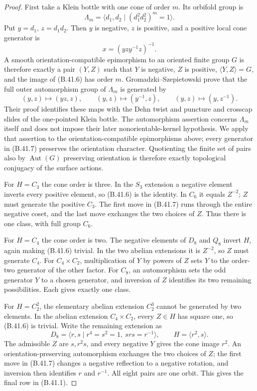 \begin{proof}
First take a Klein bottle with one cone of order $m$.
Its orbifold group is
\[
 \Lambda_m=
 \langle d_1,d_2\mid(d_1^2d_2^2)^m=1\rangle.
                                                        \tag{B.41.5}
\]
Put $y=d_1$, $z=d_1d_2$.  Then $y$ is negative, $z$ is
positive, and a positive local cone generator is
\[
                     x=(yzy^{-1}z)^{-1}.              \tag{B.41.6}
\]
A smooth orientation-compatible epimorphism to an oriented
finite group $G$ is therefore exactly a pair $(Y,Z)$ such that
$Y$ is negative, $Z$ is positive, $\langle Y,Z\rangle=G$,
and the image of (B.41.6) has order $m$.
Gromadzki--Szepietowski \cite[Lemma 3.3]{C_GromadzkiSzepietowski2016}
prove that the full outer automorphism group of $\Lambda_m$
is generated by
\[
 (y,z)\longmapsto(yz,z),\qquad
 (y,z)\longmapsto(y^{-1},z),\qquad
 (y,z)\longmapsto(y,z^{-1}).                           \tag{B.41.7}
\]
Their proof identifies these maps with the Dehn twist and
puncture and crosscap slides of the one-pointed Klein bottle.
The automorphism assertion concerns $\Lambda_m$ itself and
does not impose their later nonorientable-kernel hypothesis.
We apply that assertion to the orientation-compatible
epimorphisms above; every generator in (B.41.7) preserves the
orientation character.  Quotienting the finite set of pairs
also by $\operatorname{Aut}(G)$ preserving orientation is
therefore exactly topological conjugacy of the surface actions.

For $H=C_3$ the cone order is three.
In the $S_3$ extension a negative element inverts every
positive element, so (B.41.6) is the identity.
In $C_6$ it equals $Z^{-2}$; $Z$ must generate the positive
$C_3$.  The first move in (B.41.7) runs through the entire
negative coset, and the last move exchanges the two choices
of $Z$.  Thus there is one class, with full group $C_6$.

For $H=C_4$ the cone order is two.
The negative elements of $D_8$ and $Q_8$ invert $H$, again
making (B.41.6) trivial.  In the two abelian extensions it is
$Z^{-2}$, so $Z$ must generate $C_4$.
For $C_4\times C_2$, multiplication of $Y$ by powers of $Z$
sets $Y$ to the order-two generator of the other factor.
For $C_8$, an automorphism sets the odd generator $Y$ to a
chosen generator, and inversion of $Z$ identifies its two
remaining possibilities.  Each gives exactly one class.

For $H=C_2^2$, the elementary abelian extension $C_2^3$
cannot be generated by two elements.
In the abelian extension $C_4\times C_2$, every $Z\in H$
has square one, so (B.41.6) is trivial.
Write the remaining extension as
\[
 D_8=\langle r,s\mid r^4=s^2=1,\ srs=r^{-1}\rangle,
 \qquad H=\langle r^2,s\rangle .
\]
The admissible $Z$ are $s,r^2s$, and every negative $Y$
gives the cone image $r^2$.
An orientation-preserving automorphism exchanges the two
choices of $Z$; the first move in (B.41.7) changes a negative
reflection to a negative rotation, and inversion then
identifies $r$ and $r^{-1}$.  All eight pairs are one orbit.
This gives the final row in (B.41.1).


\end{proof}
